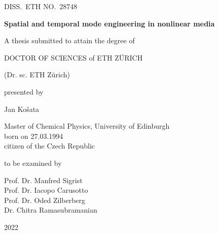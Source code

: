 
{%
 \begin{center}
%
{\Large   DISS.\ ETH NO.\ 28748}
\vspace*{\fill}


\vspace{0.2cm}

{\fontsize{16pt}{16pt} \sffamily  \bfseries \selectfont
Spatial and temporal mode engineering in nonlinear media
}

\vspace*{\fill}

{\sffamily A thesis submitted to attain the degree of}

{\MakeUppercase{Doctor of Sciences} of \MakeUppercase{ETH Z\"urich}}

(Dr. sc. ETH Z\"urich)

\vspace*{\fill}

{\sffamily  presented by }

Jan Ko\v{s}ata

Master of Chemical Physics, University of Edinburgh \\
born on 27.03.1994 \\
citizen of the Czech Republic

\vspace*{\fill}

{\sffamily to be examined by}

{Prof. Dr. Manfred Sigrist\\
Prof. Dr. Iacopo Carusotto \\	
Prof. Dr. Oded Zilberberg \\
Dr. Chitra Ramasubramanian \\
}

\vspace*{\fill}

{\Large 2022}

\leftskip=0mm
%
 \end{center}
}
\restoregeometry